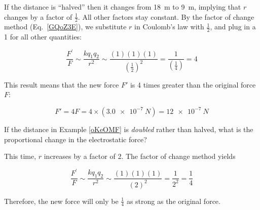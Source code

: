 \documentclass[main.tex]{subfiles}
\begin{document}
\Solution If the distance is ``halved'' then it changes from \SI{18}{m} to \SI{9}{m}, implying that $r$ changes by a factor of $\frac{1}{2}$. All other factors stay constant. By the factor of change method (Eq.~\ref{GQoZ3E}), we substitute $r$ in Coulomb's law with $\frac{1}{2}$, and plug in a 1 for all other quantities:

\begin{equation*}
    \frac{F^{\prime}}{F} \sim \frac{k q_1 q_2}{r^2} \sim \frac{(1)(1)(1)}{\left(\frac{1}{2}\right)^2} = \frac{1}{\left(\frac{1}{4}\right)} = 4
\end{equation*}

This result means that the new force $F'$ is 4 times greater than the original force $F$:

\begin{equation*}
    F' = 4 F = 4 \times \left(\SI{3.0e-7}{N}\right) = \SI{12e-7}{N}
\end{equation*}

\cyanhrule

\begin{example} 
If the distance in Example \ref{oKeOMF} is \textit{doubled} rather than halved, what is the proportional change in the electrostatic force?
\end{example}

\Solution This time, $r$ increases by a factor of 2. The factor of change method yields

\begin{equation*}
    \frac{F^{\prime}}{F} \sim \frac{k q_1 q_2}{r^2} \sim \frac{(1)(1)(1)}{(2)^2} = \frac{1}{2^2} =\frac{1}{4}
\end{equation*}

Therefore, the new force will only be $\frac{1}{4}$ as strong as the original force.

\vspace{1em}
\cyanhrule
\end{document}
